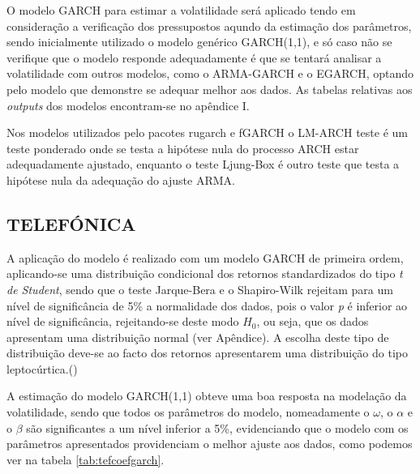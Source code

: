 \documentclass[
  12pt,
  a4paper,
  openany]{book}
\newenvironment{Shaded}{\begin{snugshade}}{\end{snugshade}}
\newcommand{\AttributeTok}[1]{\textcolor[rgb]{0.77,0.63,0.00}{#1}}
\newcommand{\CommentTok}[1]{\textcolor[rgb]{0.56,0.35,0.01}{\textit{#1}}}
\newcommand{\ConstantTok}[1]{\textcolor[rgb]{0.00,0.00,0.00}{#1}}
\newcommand{\DecValTok}[1]{\textcolor[rgb]{0.00,0.00,0.81}{#1}}
\newcommand{\FunctionTok}[1]{\textcolor[rgb]{0.00,0.00,0.00}{#1}}
\newcommand{\NormalTok}[1]{#1}
\newcommand{\OtherTok}[1]{\textcolor[rgb]{0.56,0.35,0.01}{#1}}
\newcommand{\SpecialCharTok}[1]{\textcolor[rgb]{0.00,0.00,0.00}{#1}}
\newcommand{\StringTok}[1]{\textcolor[rgb]{0.31,0.60,0.02}{#1}}
\theoremstyle{definition}
\theoremstyle{definition}
\theoremstyle{definition}
\theoremstyle{remark}
\begin{document}
O modelo GARCH para estimar a volatilidade será aplicado tendo em consideração a verificação dos pressupostos aqundo da estimação dos parâmetros, sendo inicialmente utilizado o modelo genérico GARCH(1,1), e só caso não se verifique que o modelo responde adequadamente é que se tentará analisar a volatilidade com outros modelos, como o ARMA-GARCH e o EGARCH, optando pelo modelo que demonstre se adequar melhor aos dados. As tabelas relativas aos \emph{outputs} dos modelos encontram-se no apêndice I.

Nos modelos utilizados pelo pacotes rugarch e fGARCH o LM-ARCH teste é um teste ponderado onde se testa a hipótese nula do processo ARCH estar adequadamente ajustado, enquanto o teste Ljung-Box é outro teste que testa a hipótese nula da adequação do ajuste ARMA.

\hypertarget{telefuxf3nica}{%
\subsection{TELEFÓNICA}\label{telefuxf3nica}}

A aplicação do modelo é realizado com um modelo GARCH de primeira ordem, aplicando-se uma distribuição condicional dos retornos standardizados do tipo \emph{t de Student}, sendo que o teste Jarque-Bera e o Shapiro-Wilk rejeitam para um nível de significância de 5\% a normalidade dos dados, pois o valor \emph{p} é inferior ao nível de significância, rejeitando-se deste modo \(H_0\), ou seja, que os dados apresentam uma distribuição normal (ver Apêndice). A escolha deste tipo de distribuição deve-se ao facto dos retornos apresentarem uma distribuição do tipo leptocúrtica.(\citet{rvol})

A estimação do modelo GARCH(1,1) obteve uma boa resposta na modelação da volatilidade, sendo que todos os parâmetros do modelo, nomeadamente o \(\omega\), o \(\alpha\) e o \(\beta\) são significantes a um nível inferior a 5\%, evidenciando que o modelo com os parâmetros apresentados providenciam o melhor ajuste aos dados, como podemos ver na tabela \ref{tab:tefcoefgarch}.

\scriptsize

\begin{Shaded}
\end{Shaded}
\end{document}
